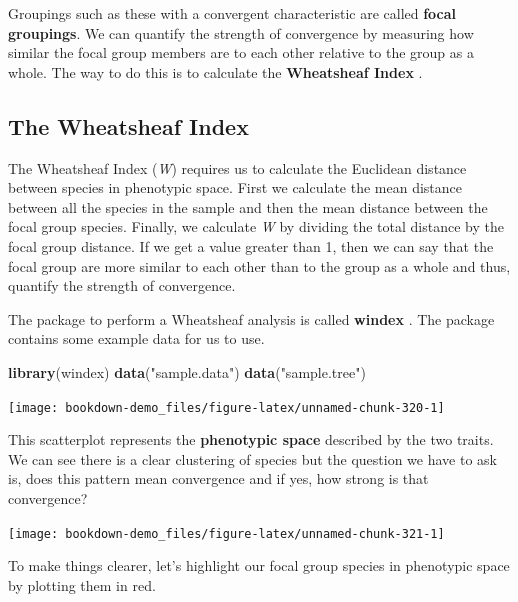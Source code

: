 \documentclass[
]{book}
\newenvironment{Shaded}{\begin{snugshade}}{\end{snugshade}}
\newcommand{\KeywordTok}[1]{\textcolor[rgb]{0.13,0.29,0.53}{\textbf{#1}}}
\newcommand{\NormalTok}[1]{#1}
\newcommand{\StringTok}[1]{\textcolor[rgb]{0.31,0.60,0.02}{#1}}
\begin{document}
Groupings such as these with a convergent characteristic are called \textbf{focal groupings}. We can quantify the strength of convergence by measuring how similar the focal group members are to each other relative to the group as a whole. The way to do this is to calculate the \textbf{Wheatsheaf Index} \citep{Arbuckle14}.

\hypertarget{the-wheatsheaf-index}{%
\subsection{The Wheatsheaf Index}\label{the-wheatsheaf-index}}

The Wheatsheaf Index (\emph{W}) requires us to calculate the Euclidean distance between species in phenotypic space. First we calculate the mean distance between all the species in the sample and then the mean distance between the focal group species. Finally, we calculate \emph{W} by dividing the total distance by the focal group distance. If we get a value greater than 1, then we can say that the focal group are more similar to each other than to the group as a whole and thus, quantify the strength of convergence.

The package to perform a Wheatsheaf analysis is called \textbf{windex} \citep{windex}. The package contains some example data for us to use.

\begin{Shaded}
\begin{Highlighting}[]
\KeywordTok{library}\NormalTok{(windex)}
\KeywordTok{data}\NormalTok{(}\StringTok{"sample.data"}\NormalTok{)}
\KeywordTok{data}\NormalTok{(}\StringTok{"sample.tree"}\NormalTok{)}
\end{Highlighting}
\end{Shaded}

\begin{center}\texttt{[image: bookdown-demo\_files/figure-latex/unnamed-chunk-320-1]} \end{center}

This scatterplot represents the \textbf{phenotypic space} described by the two traits. We can see there is a clear clustering of species but the question we have to ask is, does this pattern mean convergence and if yes, how strong is that convergence?

\begin{center}\texttt{[image: bookdown-demo\_files/figure-latex/unnamed-chunk-321-1]} \end{center}

To make things clearer, let's highlight our focal group species in phenotypic space by plotting them in red.
\end{document}
